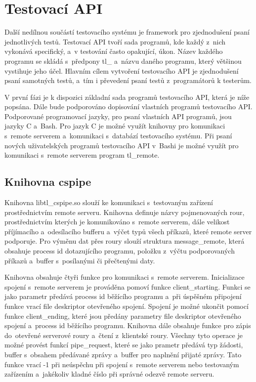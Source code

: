 \chapter{Testovací API}
Další nedílnou součástí testovacího systému je framework pro zjednodušení psaní jednotlivých testů. Testovací API tvoří sada programů, kde každý z~nich vykonává specifický, a~v testování často opakující, úkon. Název každého programu se skládá s~předpony tl\_ a~názvu daného programu, který většinou vystihuje jeho účel. Hlavním cílem vytvoření testovacího API je zjednodušení psaní samotných testů, a~tím i převedení psaní testů z~programátorů k testerům.

V první fázi je k dispozici základní sada programů testovacího API, která je níže popsána. Dále bude podporováno dopisování vlastních programů testovacího API. Podporované programovací jazyky, pro psaní vlastních API programů, jsou jazyky C a~Bash. Pro jazyk C je možné využít knihovny pro komunikaci s~remote serverem a~komunikaci s~databází testovacího systému. Při psaní nových uživatelských programů testovacího API v~Bashi je možné využít pro komunikaci s~remote serverem program tl\_remote.

\section{Knihovna cspipe}
Knihovna libtl\_cspipe.so slouží ke komunikaci s~testovaným zařízení prostřednictvím remote serveru. Knihovna definuje názvy pojmenovaných rour, prostřednictvím kterých je komunikováno s~remote serverem, dále velikost příjímacího a~odesílacího bufferu a~výčet typů všech příkazů, které remote server podporuje. Pro výměnu dat přes roury slouží struktura message\_remote, která obsahuje process id dotazujícího programu, položku z~výčtu podporovaných příkazů a~buffer s~posílanými či přečtenými daty.

Knihovna obsahuje čtyři funkce pro komunikaci s~remote serverem. Inicializace spojení s~remote serverem je prováděna pomoví funkce client\_starting. Funkci se jako parametr předává process id běžícího programu a~při úspěšném připojení funkce vrací file deskriptor otevřeného spojení. Spojení je možné ukončit pomocí funkce client\_ending, které jsou předány parametry file deskriptor otevřeného spojení a~process id běžícího programu. Knihovna dále obsahuje funkce pro zápis do~otevřené serverové roury a~čtení z~klientské roury. Všechny tyto operace je možné provést funkcí pipe\_request, které se jako prametr předává typ žádosti, buffer s~obsahem předávané zprávy a~buffer pro naplnění přijaté zprávy. Tato funkce vrací -1 při neúspěchu při spojení s~remote serverem nebo testovaným zařízením a~jakékoliv kladné číslo při správné odezvě remote serveru.

